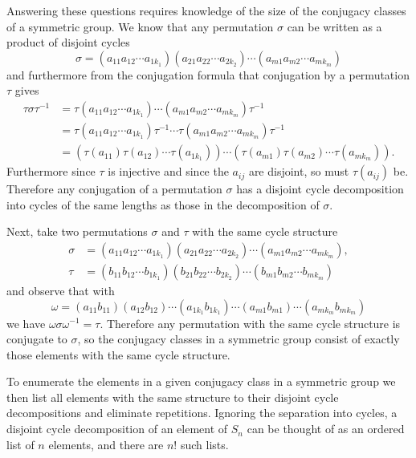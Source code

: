 \documentclass{article}
\begin{document}
\begin{Answer}
Answering these questions requires knowledge of the size of the
conjugacy classes of a symmetric group.
We know that any permutation $\sigma$ can be written as a product of
disjoint cycles
$$
\sigma =
  (a_{11} a_{12} \cdots a_{1k_1})
  (a_{21} a_{22} \cdots a_{2k_2})
  \cdots
  (a_{m1} a_{m2} \cdots a_{mk_m})
$$
and furthermore from the conjugation formula that conjugation by a
permutation $\tau$ gives
\begin{align*}
\tau \sigma \tau^{-1} &=
  \tau
  (a_{11} a_{12} \cdots a_{1k_1})
  \cdots
  (a_{m1} a_{m2} \cdots a_{mk_m})
  \tau^{-1} \\
&=
  \tau
  (a_{11} a_{12} \cdots a_{1k_1})
  \tau^{-1}
  \cdots
  \tau
  (a_{m1} a_{m2} \cdots a_{mk_m})
  \tau^{-1} \\
&=
  (\tau(a_{11}) \tau(a_{12}) \cdots \tau(a_{1k_1}))
  \cdots
  (\tau(a_{m1}) \tau(a_{m2}) \cdots \tau(a_{mk_m})).
\end{align*}
Furthermore since $\tau$ is injective and since the $a_{ij}$ are
disjoint, so must $\tau(a_{ij})$ be.
Therefore any conjugation of a permutation $\sigma$ has a disjoint
cycle decomposition into cycles of the same lengths as those in the
decomposition of $\sigma$.

Next, take two permutations $\sigma$ and $\tau$ with the same cycle
structure
\begin{align*}
\sigma &=
  (a_{11} a_{12} \cdots a_{1k_1})
  (a_{21} a_{22} \cdots a_{2k_2})
  \cdots
  (a_{m1} a_{m2} \cdots a_{mk_m}), \\
\tau &=
  (b_{11} b_{12} \cdots b_{1k_1})
  (b_{21} b_{22} \cdots b_{2k_2})
  \cdots
  (b_{m1} b_{m2} \cdots b_{mk_m})
\end{align*}
and observe that with
$$
\omega =
  (a_{11} b_{11})
  (a_{12} b_{12})
  \cdots
  (a_{1k_1} b_{1k_1})
  \cdots
  (a_{m1} b_{m1})
  \cdots
  (a_{mk_m} b_{mk_m})
$$
we have $\omega \sigma \omega^{-1} = \tau$. Therefore any permutation
with the same cycle structure is conjugate to $\sigma$, so the
conjugacy classes in a symmetric group consist of exactly those
elements with the same cycle structure.

To enumerate the elements in a given conjugacy class in a symmetric
group we then list all elements with the same structure to their
disjoint cycle decompositions and eliminate repetitions. Ignoring the
separation into cycles, a disjoint cycle decomposition of an element
of $S_n$ can be thought of as an ordered list of $n$ elements, and
there are $n!$ such lists.


\end{Answer}
\end{document}
